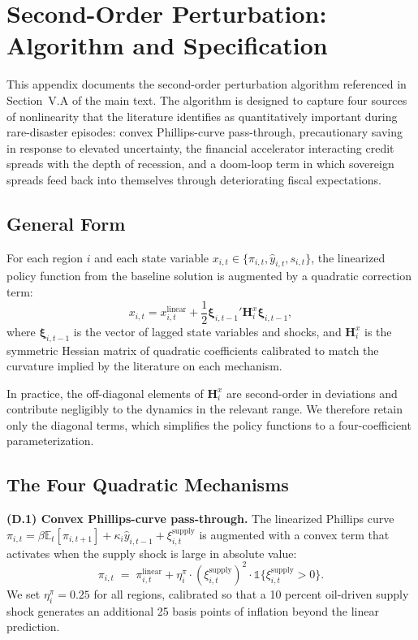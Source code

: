 \documentclass[12pt]{article}
\begin{document}
\section{Second-Order Perturbation: Algorithm and Specification}
\label{app:nonlinear}

This appendix documents the second-order perturbation algorithm referenced in Section~V.A of the main text. The algorithm is designed to capture four sources of nonlinearity that the literature identifies as quantitatively important during rare-disaster episodes: convex Phillips-curve pass-through, precautionary saving in response to elevated uncertainty, the financial accelerator interacting credit spreads with the depth of recession, and a doom-loop term in which sovereign spreads feed back into themselves through deteriorating fiscal expectations.

\subsection{General Form}

For each region $i$ and each state variable $x_{i,t} \in \{\pi_{i,t}, \hat{y}_{i,t}, s_{i,t}\}$, the linearized policy function from the baseline solution is augmented by a quadratic correction term:
\begin{equation}
x_{i,t} = x_{i,t}^{\text{linear}} + \frac{1}{2} \boldsymbol{\xi}_{i,t-1}' \mathbf{H}^x_i \boldsymbol{\xi}_{i,t-1},
\end{equation}
where $\boldsymbol{\xi}_{i,t-1}$ is the vector of lagged state variables and shocks, and $\mathbf{H}^x_i$ is the symmetric Hessian matrix of quadratic coefficients calibrated to match the curvature implied by the literature on each mechanism.

In practice, the off-diagonal elements of $\mathbf{H}^x_i$ are second-order in deviations and contribute negligibly to the dynamics in the relevant range. We therefore retain only the diagonal terms, which simplifies the policy functions to a four-coefficient parameterization.

\subsection{The Four Quadratic Mechanisms}

\textbf{(D.1) Convex Phillips-curve pass-through.} The linearized Phillips curve $\pi_{i,t} = \beta \mathbb{E}_t[\pi_{i,t+1}] + \kappa_i \hat{y}_{i,t-1} + \xi^{\text{supply}}_{i,t}$ is augmented with a convex term that activates when the supply shock is large in absolute value:
\begin{equation}
\pi_{i,t} \;=\; \pi_{i,t}^{\text{linear}} + \eta^\pi_i \cdot (\xi^{\text{supply}}_{i,t})^2 \cdot \mathbb{1}\{\xi^{\text{supply}}_{i,t} > 0\}.
\end{equation}
We set $\eta^\pi_i = 0.25$ for all regions, calibrated so that a 10 percent oil-driven supply shock generates an additional 25 basis points of inflation beyond the linear prediction.
\end{document}
